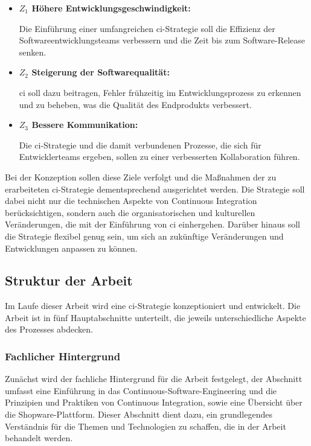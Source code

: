 \begin{itemize}
    \item {
        \textbf{$Z_1$ Höhere Entwicklungsgeschwindigkeit:}\par
        Die Einführung einer umfangreichen \acrshort{ci}-Strategie soll die Effizienz der Softwareentwicklungsteams
        verbessern und die Zeit bis zum Software-Release senken.
    }

    \item {
        \textbf{$Z_2$ Steigerung der Softwarequalität:}\par
        \acrshort{ci} soll dazu beitragen, Fehler frühzeitig im Entwicklungsprozess zu erkennen und zu beheben, was die
        Qualität des Endprodukts verbessert.
    }

    \item{
        \textbf{$Z_3$ Bessere Kommunikation:}\par
        Die \acrshort{ci}-Strategie und die damit verbundenen Prozesse, die sich für Entwicklerteams ergeben, sollen zu
        einer verbesserten Kollaboration führen.
    }
\end{itemize}

Bei der Konzeption sollen diese Ziele verfolgt und die Maßnahmen der zu erarbeiteten \acrshort{ci}-Strategie
dementsprechend ausgerichtet werden.
Die Strategie soll dabei nicht nur die technischen Aspekte von Continuous Integration berücksichtigen, sondern auch die
organisatorischen und kulturellen Veränderungen, die mit der Einführung von \acrshort{ci} einhergehen.
Darüber hinaus soll die Strategie flexibel genug sein, um sich an zukünftige Veränderungen und Entwicklungen anpassen
zu können.

\subsection{Struktur der Arbeit} \label{subsec:01-introduction-3}

Im Laufe dieser Arbeit wird eine \acrshort{ci}-Strategie konzeptioniert und entwickelt.
Die Arbeit ist in fünf Hauptabschnitte unterteilt, die jeweils unterschiedliche Aspekte des Prozesses abdecken.

\subsubsection{Fachlicher Hintergrund}

Zunächst wird der fachliche Hintergrund für die Arbeit festgelegt, der Abschnitt umfasst eine Einführung in das
Continuous-Software-Engineering und die Prinzipien und Praktiken von Continuous Integration, sowie eine Übersicht über die
Shopware-Plattform.
Dieser Abschnitt dient dazu, ein grundlegendes Verständnis für die Themen und Technologien zu schaffen, die in der
Arbeit behandelt werden.

